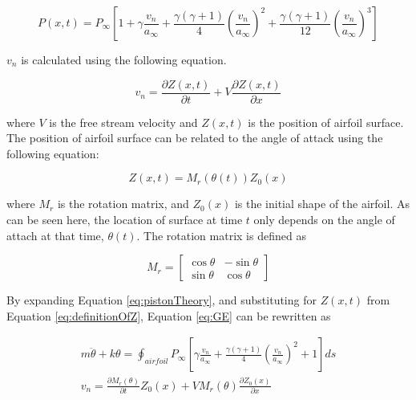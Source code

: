 \documentclass[12pt, a4paper]{extarticle}
\begin{document}
\begin{equation}
	P(x,t) = P_\infty
	\left[
	1 +
	\gamma \frac{v_n}{a_\infty} + 
	\frac{\gamma (\gamma + 1)}{4} \left( \frac{v_n}{a_\infty} \right)^2 + 
	\frac{\gamma (\gamma + 1)}{12} \left( \frac{v_n}{a_\infty} \right)^3
	\right]
\end{equation}

$v_n$ is calculated using the following equation.

\begin{equation}\label{eq:definitionOfVn}
	v_n = \frac{\partial Z(x,t)}{\partial t} + V \frac{\partial Z(x,t)}{\partial x}
\end{equation}

where $V$ is the free stream velocity and $Z(x,t)$ is the position of airfoil surface. The position of airfoil surface can be related to the angle of attack using the following equation:

\begin{equation}\label{eq:definitionOfZ}
	Z(x,t) = M_r\left( \theta(t) \right) Z_0(x)
\end{equation}

where $M_r$ is the rotation matrix, and $Z_0(x)$ is the initial shape of the airfoil.  As can be seen here, the location of surface at time $t$ only depends on the angle of attach at that time, $\theta(t)$. The rotation matrix is defined as

\begin{equation*}
	M_r = 
	\begin{bmatrix}
		\cos \theta & -\sin \theta \\
		\sin \theta & \cos \theta
	\end{bmatrix}
\end{equation*}

By expanding Equation \eqref{eq:pistonTheory}, and substituting for $Z(x,t)$ from Equation \eqref{eq:definitionOfZ}, Equation \eqref{eq:GE} can be rewritten as

\begin{subequations}
\begin{gather}
	m\ddot{\theta} + k \theta = 
	\oint_{airfoil} P_\infty
	\left[
	\gamma \frac{v_n}{a_\infty} +
	\frac{\gamma (\gamma + 1)}{4} \left( \frac{v_n}{a_\infty}\right)^2 +
	1
	\right] ds
	\\
	v_n = 
	\frac{\partial M_r(\theta)}{\partial t}Z_0(x) + V M_r(\theta)\frac{\partial Z_0(x)}{\partial x}
\end{gather}\label{eq:GEfull}
\end{subequations}
\end{document}

